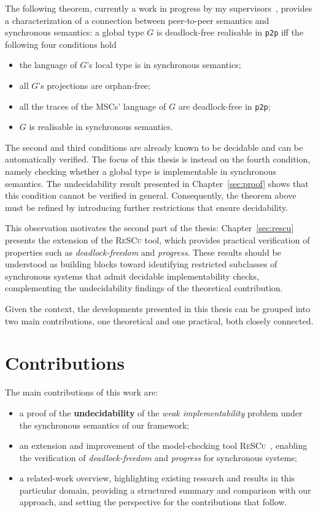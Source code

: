 The following theorem, currently a work in progress by my 
supervisors~\cite[Theorem 5.3]{di2025realisability}, 
provides a characterization of a connection between 
peer-to-peer semantics and synchronous semantics:
a global type $G$ is deadlock-free realisable in \verb|p2p| iff
the following four conditions hold
\begin{itemize}
  \item the language of $G$'s local type is in synchronous semantics;
  \item all $G$'s projections are orphan-free;
  \item all the traces of the MSCs' language of $G$ are deadlock-free
  in \verb|p2p|;
  \item $G$ is realisable in synchronous semantics.
\end{itemize}

The second and third conditions are already known to be decidable and 
can be automatically verified. The focus of this thesis is instead on 
the fourth condition, namely checking whether a global type is 
implementable in synchronous semantics. The undecidability result 
presented in Chapter~\ref{sec:proof} shows that this condition cannot 
be verified in general. Consequently, the theorem above must be refined 
by introducing further restrictions that ensure decidability.  

This observation motivates the second part of the thesis: 
Chapter~\ref{sec:rescu} presents the extension of the 
\textsc{ReSCu} tool, which provides practical verification of 
properties such as \emph{deadlock-freedom} and \emph{progress}. These 
results should be understood as building blocks toward identifying 
restricted subclasses of synchronous systems that admit decidable 
implementability checks, complementing the undecidability findings of 
the theoretical contribution.

Given the context, the developments presented in this thesis can be 
grouped into two main
contributions, one theoretical and one practical, both closely
connected.

\section{Contributions}
The main contributions of this work are: 
\begin{itemize}
    \item a proof of the \textbf{undecidability} of the 
    \textit{weak implementability} problem under the synchronous 
    semantics of our framework;
    \item an extension and improvement of the model-checking tool 
    \textsc{ReSCu}~\cite{rescurepo}, enabling the verification of 
    \textit{deadlock-freedom} and \textit{progress} for synchronous 
    systems;
    \item a related-work overview, highlighting existing research and 
    results in this particular domain, providing a structured summary 
    and comparison with our approach, and setting the perspective for 
    the contributions that follow.
\end{itemize}

